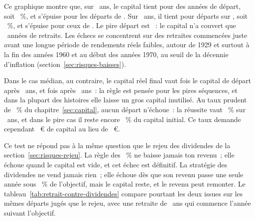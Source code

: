 Ce graphique montre que, sur \RetraitHistAnsDreissig~ans, le capital tient pour
\RetraitHistTenusDreissig{} des \RetraitHistDebutsDreissig{} ann\'ees de d\'epart, soit
\RetraitHistReussiteDreissig~\%, et s'\'epuise pour les d\'eparts de \RetraitHistEchecsListeDreissig.
Sur \RetraitHistAnsVierzig~ans, il tient pour \RetraitHistTenusVierzig{} d\'eparts sur
\RetraitHistDebutsVierzig, soit \RetraitHistReussiteVierzig~\%, et s'\'epuise pour ceux de
\RetraitHistEchecsListeVierzig. Le pire d\'epart est \RetraitHistPireDebutVierzig~: le capital n'a
couvert que \RetraitHistPireDureeVierzig~ann\'ees de retraits. Les \'echecs se concentrent sur des
retraites commenc\'ees juste avant une longue p\'eriode de rendements r\'eels faibles, autour de 1929
et surtout \`a la fin des ann\'ees 1960 et au d\'ebut des ann\'ees 1970, au seuil de la d\'ecennie
d'inflation (section~\ref{sec:risques-baisses}).

Dans le cas m\'edian, au contraire, le capital r\'eel final vaut \RetraitHistFinMedianeFoisDreissig{}
fois le capital de d\'epart apr\`es \RetraitHistAnsDreissig~ans, et \RetraitHistFinMedianeFoisVierzig{}
fois apr\`es \RetraitHistAnsVierzig~ans~: la r\`egle est pens\'ee pour les pires s\'equences, et dans
la plupart des histoires elle laisse un gros capital inutilis\'e. Au taux prudent de
\TauxRetraitPrudent~\% du chapitre~\ref{sec:capital}, aucun d\'epart n'\'echoue~: la r\'eussite vaut
\RetraitHistReussitePrudentVierzig~\% sur \RetraitHistAnsVierzig~ans, et dans le pire cas il reste
encore \RetraitHistPrudentFinMinVierzig~\% du capital initial. Ce taux demande cependant
\KapitalEtfPrudent~€ de capital au lieu de \KapitalEtfReferenz~€.

Ce test ne r\'epond pas \`a la m\^eme question que le rejeu des dividendes de la
section~\ref{sec:risques-rejeu}. La r\`egle des \TauxRetrait~\% ne baisse jamais ton revenu~; elle
\'echoue quand le capital est vide, et cet \'echec est d\'efinitif. La strat\'egie des dividendes ne
vend jamais rien~; elle \'echoue d\`es que son revenu passe une seule ann\'ee sous \SeuilReussite~\% de
l'objectif, mais le capital reste, et le revenu peut remonter. Le
tableau~\ref{tab:retrait-contre-dividendes} compare pourtant les deux issues sur les m\^emes
\RetraitHistMemesDepartsJuges{} d\'eparts jug\'es que le rejeu, avec une retraite de
\RetraitHistAnsVierzig~ans qui commence l'ann\'ee suivant l'objectif.

